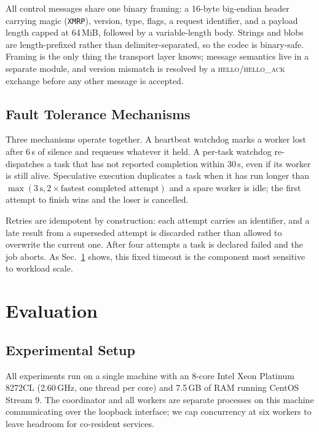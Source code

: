 \documentclass[conference]{IEEEtran}
\begin{document}
All control messages share one binary framing: a 16-byte big-endian header
carrying magic (\texttt{XMRP}), version, type, flags, a request identifier,
and a payload length capped at 64\,MiB, followed by a variable-length body.
Strings and blobs are length-prefixed rather than delimiter-separated, so the
codec is binary-safe. Framing is the only thing the transport layer knows;
message semantics live in a separate module, and version mismatch is resolved
by a \textsc{hello}/\textsc{hello\_ack} exchange before any other message is
accepted.

\subsection{Fault Tolerance Mechanisms}

Three mechanisms operate together. A heartbeat watchdog marks a worker lost
after $6$\,s of silence and requeues whatever it held. A per-task watchdog
re-dispatches a task that has not reported completion within $30$\,s, even if
its worker is still alive. Speculative execution duplicates a task when it
has run longer than $\max(3\,\text{s}, 2\times\text{fastest completed
attempt})$ and a spare worker is idle; the first attempt to finish wins and
the loser is cancelled.

Retries are idempotent by construction: each attempt carries an identifier,
and a late result from a superseded attempt is discarded rather than allowed
to overwrite the current one. After four attempts a task is declared failed
and the job aborts. As Sec.~\ref{sec:eval} shows, this fixed timeout is the
component most sensitive to workload scale.

\section{Evaluation}
\label{sec:eval}

\subsection{Experimental Setup}

All experiments run on a single machine with an 8-core Intel Xeon Platinum
8272CL (2.60\,GHz, one thread per core) and 7.5\,GB of RAM running
CentOS Stream 9. The coordinator and all workers are separate processes on
this machine communicating over the loopback interface; we cap concurrency
at six workers to leave headroom for co-resident services.
\end{document}
